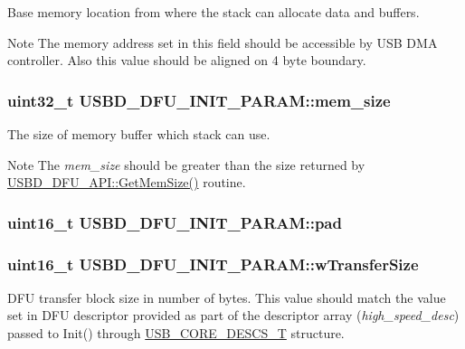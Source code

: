 Base memory location from where the stack can allocate data and buffers. \begin{DoxyNote}{Note}
The memory address set in this field should be accessible by U\-S\-B D\-M\-A controller. Also this value should be aligned on 4 byte boundary. 
\end{DoxyNote}
\hypertarget{structUSBD__DFU__INIT__PARAM_a4624ef53dbdf39e27314fa7b19d6720d}{
\subsubsection[{mem\-\_\-size}]{\setlength{\rightskip}{0pt plus 5cm}uint32\-\_\-t U\-S\-B\-D\-\_\-\-D\-F\-U\-\_\-\-I\-N\-I\-T\-\_\-\-P\-A\-R\-A\-M\-::mem\-\_\-size}}\label{structUSBD__DFU__INIT__PARAM_a4624ef53dbdf39e27314fa7b19d6720d}
The size of memory buffer which stack can use. \begin{DoxyNote}{Note}
The {\itshape mem\-\_\-size} should be greater than the size returned by \hyperlink{structUSBD__DFU__API_a91b64bb4209cfa9e3254bd3ba8963cdc}{U\-S\-B\-D\-\_\-\-D\-F\-U\-\_\-\-A\-P\-I\-::\-Get\-Mem\-Size()} routine. 
\end{DoxyNote}
\hypertarget{structUSBD__DFU__INIT__PARAM_a12378565018adc1588b6fd4f12e3a5dc}{
\subsubsection[{pad}]{\setlength{\rightskip}{0pt plus 5cm}uint16\-\_\-t U\-S\-B\-D\-\_\-\-D\-F\-U\-\_\-\-I\-N\-I\-T\-\_\-\-P\-A\-R\-A\-M\-::pad}}\label{structUSBD__DFU__INIT__PARAM_a12378565018adc1588b6fd4f12e3a5dc}
\hypertarget{structUSBD__DFU__INIT__PARAM_a497bbbfa6751823b9e288c257456b56f}{
\subsubsection[{w\-Transfer\-Size}]{\setlength{\rightskip}{0pt plus 5cm}uint16\-\_\-t U\-S\-B\-D\-\_\-\-D\-F\-U\-\_\-\-I\-N\-I\-T\-\_\-\-P\-A\-R\-A\-M\-::w\-Transfer\-Size}}\label{structUSBD__DFU__INIT__PARAM_a497bbbfa6751823b9e288c257456b56f}
D\-F\-U transfer block size in number of bytes. This value should match the value set in D\-F\-U descriptor provided as part of the descriptor array ({\itshape high\-\_\-speed\-\_\-desc}) passed to Init() through \hyperlink{group__USBD__Core_gabdc617d119eac0555f91bea957c41ecc}{U\-S\-B\-\_\-\-C\-O\-R\-E\-\_\-\-D\-E\-S\-C\-S\-\_\-\-T} structure. 

